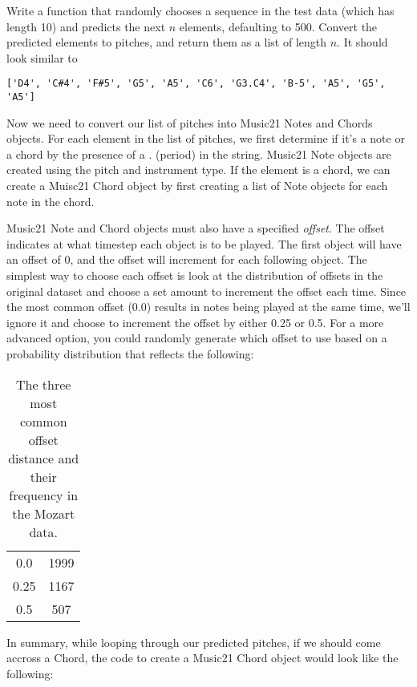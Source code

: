 \begin{problem}
Write a function that randomly chooses a sequence in the test data (which has length 10) and predicts the next $n$ elements, defaulting to 500.
Convert the predicted elements to pitches, and return them as a list of length $n$.
It should look similar to 

\begin{lstlisting}
['D4', 'C#4', 'F#5', 'G5', 'A5', 'C6', 'G3.C4', 'B-5', 'A5', 'G5', 'A5']
\end{lstlisting}


\label{prob:prediction}
\end{problem}

Now we need to convert our list of pitches into Music21 Notes and Chords objects.
For each element in the list of pitches, we first determine if it's a note or a chord by the presence of a . (period) in the string.
Music21 Note objects are created using the pitch and instrument type.
If the element is a chord, we can create a Muisc21 Chord object by first creating a list of Note objects for each note in the chord.

Music21 Note and Chord objects must also have a specified \emph{offset}.
The offset indicates at what timestep each object is to be played.
The first object will have an offset of 0, and the offset will increment for each following object.
The simplest way to choose each offset is look at the distribution of offsets in the original dataset and choose a set amount to increment the offset each time.
Since the most common offset (0.0) results in notes being played at the same time, we'll ignore it and choose to increment the offset by either 0.25 or 0.5.
For a more advanced option, you could randomly generate which offset to use based on a probability distribution that reflects the following: 

\begin{table}[H]
\centering
\begin{tabular}{c|c}
0.0 & 1999\\
0.25 & 1167\\
0.5 & 507\\
\end{tabular}
\caption{The three most common offset distance and their frequency in the Mozart data.}
\end{table}

\noindent In summary, while looping through our predicted pitches, if we should come accross a Chord, the code to create a Music21 Chord object would look like the following:

